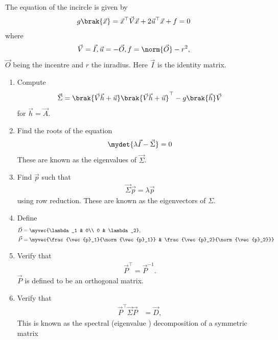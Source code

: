 The equation of the incircle is given by 
		\begin{align}
			 \label{eq:conic_quad_form}
	  {g}\brak{\vec{x}}=
			\vec{x}^{\top}\vec{V}\vec{x}+2\vec{u}^{\top}\vec{x}+f = 0
		\end{align}
		where 
		\begin{align}
			 \label{eq:conic_quad_form-params}
			\vec{V}=\vec{I}, \vec{u}=-\vec{O}, f = \norm{\vec{O}}-r^2,
		\end{align}
		$\vec{O}$ being the incentre and $r$ the inradius.  Here $\vec{I}$ is the identity matrix.
\begin{enumerate}[label=\thesubsection.\arabic*.,ref=\thesubsection.\theenumi]
\item Compute 
\begin{align}
	\label{eq:incircle-disc-Sigma}
\vec{\Sigma} = 
\brak{\vec{V}\vec{h}+\vec{u}}
	  \brak{\vec{V}\vec{h}+\vec{u}}^{\top}
   -
	  {g}\brak{\vec{h}}\vec{V}
\end{align}
for $\vec{h}=\vec{A}$.
\item Find the roots of the equation
\begin{align}
	\mydet{\lambda \vec{I}-\vec{\Sigma}} = 0
\end{align}
These are known as the eigenvalues of $\vec{\Sigma}$.
\item Find $\vec{p}$  such that 
\begin{align}
	\vec{\Sigma}\vec{p}
	=\lambda\vec{p}
\end{align}
using row reduction.  These are known as the eigenvectors of $\Sigma$.
\item Define
    \begin{align}
      \label{eq:conic_parmas_eig_def-D}
      \vec{D} &= \myvec{\lambda_1 & 0\\ 0 & \lambda_2}, 
      \\
	    \vec{P} &= \myvec{\frac{\vec{p}_1}{\norm{\vec{p}_1}} & \frac{\vec{p}_2}{\norm{\vec{p}_2}}}
      \label{eq:eigevecP}
    \end{align}
    \item Verify that
  \begin{align}
\vec{P}^{\top}=\vec{P}^{-1}.
  \label{eq:orth-mat}
  \end{align}
  $\vec{P}$ is defined to be an orthogonal matrix.
\item Verify that
    \begin{align}
      \label{eq:conic_parmas_eig_def}
      \vec{P}^{\top}\vec{\Sigma}\vec{P} &= \vec{D},
    \end{align} 
		This is known as the spectral (eigenvalue ) decomposition of a symmetric matrix 


\end{enumerate}
